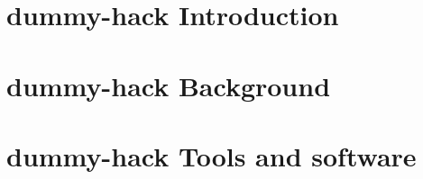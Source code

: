 


	\chapter{dummy-hack Introduction}
	\chapter{dummy-hack Background}
	\chapter{dummy-hack Tools and software}
	
	
	
